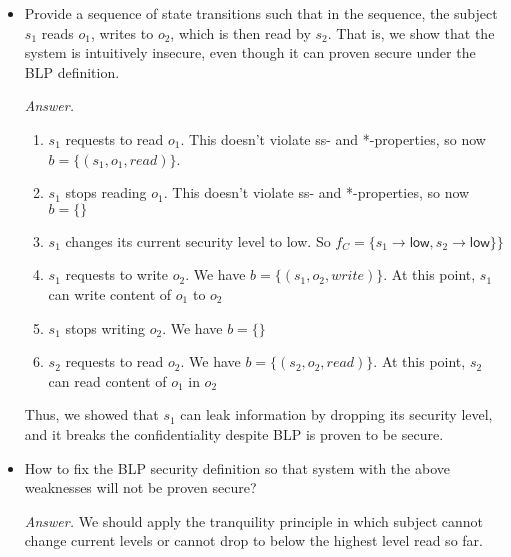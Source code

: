 \documentclass[11pt]{article}
\newcommand{\wri}{write}
\begin{document}
\begin{description}
{\begin{itemize}
\begin{mdframed}
\begin{itemize}
		 \item
		A subject $s$ stops writing an object $o$, which succeeds if $(s,o,\wri)$ is in $b$,
		and results in $(s,o,\wri)$ being removed from $b$. This is similar to second transition; therefore, using same argument, $S_{k+1}$ is secure

		\item
		Change the current security level of a subject, which succeeds if after the change,
		the ss-property and *-property are satisfied. Again, this implies $S_{k+1}$ is secure state.  
	\end{itemize}
	We showed that for all possible transitions from $S_{k}$ to $S_{k+1}$, if $S_k$ is secure state, then $S_{k+1}$ is secure state. We complete our proof.
\end{mdframed}
 \item
Provide a sequence of state transitions such that in the sequence, the subject $s_1$
reads $o_1$, writes to $o_2$, which is then read by $s_2$.  That is, we show that the
system is intuitively insecure, even though it can proven secure under the BLP definition.
\begin{mdframed}
	\textit{Answer. }
	\begin{enumerate}
		\item $s_1$ requests to read $o_1$. This doesn't violate ss- and *-properties, so now $b = \{(s_1,o_1,read)\}$. 
		\item $s_1$ stops reading $o_1$. This doesn't violate ss- and *-properties, so now $b = \{\}$
		\item $s_1$ changes its current security level to low. So $f_C=\{s_1\rightarrow \mathsf{low}, s_2\rightarrow \mathsf{low}\}\}$
		\item $s_1$ requests to write $o_2$. We have $b = \{(s_1,o_2,write)\}$. At this point, $s_1$ can write content of $o_1$ to $o_2$
		\item $s_1$ stops writing $o_2$. We have $b = \{\}$
		\item $s_2$ requests to read $o_2$. We have $b = \{(s_2,o_2,read)\}$. At this point, $s_2$ can read content of $o_1$ in $o_2$
	\end{enumerate}
	Thus, we showed that $s_1$ can leak information by dropping its security level, and it breaks the confidentiality despite BLP is proven to be secure. 
\end{mdframed}
 \item
How to fix the BLP security definition so that system with the above weaknesses will
not be proven secure?\\
\begin{mdframed}
	\textit{Answer. } We should apply the tranquility principle in which subject cannot change current levels or cannot drop to below the highest level read so far.
\end{mdframed}
\end{itemize}
}


\end{description}
\end{document}
